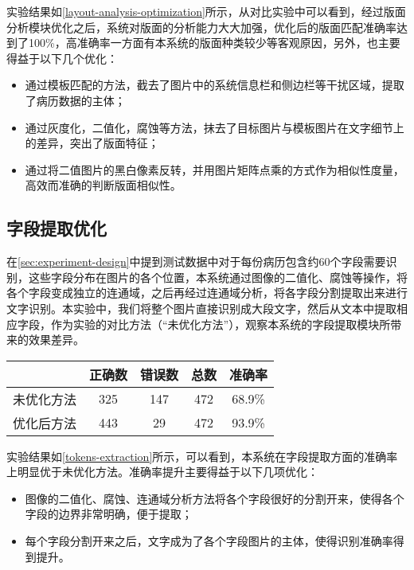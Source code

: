 实验结果如\autoref{layout-analysis-optimization}所示，从对比实验中可以看到，经过版面分析模块优化之后，系统对版面的分析能力大大加强，优化后的版面匹配准确率达到了100\%，高准确率一方面有本系统的版面种类较少等客观原因，另外，也主要得益于以下几个优化：
\begin{itemize}
  \item 通过模板匹配的方法，截去了图片中的系统信息栏和侧边栏等干扰区域，提取了病历数据的主体；
  \item 通过灰度化，二值化，腐蚀等方法，抹去了目标图片与模板图片在文字细节上的差异，突出了版面特征；
  \item 通过将二值图片的黑白像素反转，并用图片矩阵点乘的方式作为相似性度量，高效而准确的判断版面相似性。
\end{itemize}

\subsection{字段提取优化}
在\autoref{sec:experiment-design}中提到测试数据中对于每份病历包含约60个字段需要识别，这些字段分布在图片的各个位置，本系统通过图像的二值化、腐蚀等操作，将各个字段变成独立的连通域，之后再经过连通域分析，将各字段分割提取出来进行文字识别。本实验中，我们将整个图片直接识别成大段文字，然后从文本中提取相应字段，作为实验的对比方法（“未优化方法”），观察本系统的字段提取模块所带来的效果差异。
\begin{table}[!htbp]
	\label{tokens-extraction}
	\centering
	\vspace{10pt}
  \renewcommand\arraystretch{1.5}  %
	\begin{tabular}{c||c|c|c|c}
    \hline
    & 正确数 & 错误数 & 总数 & 准确率 \\
		\hline
    未优化方法 & 325 & 147 & 472 & 68.9\% \\
		\hline
    优化后方法 & 443 & 29 & 472 & 93.9\% \\
    \hline
	\end{tabular}
\end{table}

实验结果如\autoref{tokens-extraction}所示，可以看到，本系统在字段提取方面的准确率上明显优于未优化方法。准确率提升主要得益于以下几项优化：
\begin{itemize}
  \item 图像的二值化、腐蚀、连通域分析方法将各个字段很好的分割开来，使得各个字段的边界非常明确，便于提取；
  \item 每个字段分割开来之后，文字成为了各个字段图片的主体，使得识别准确率得到提升。
\end{itemize}

